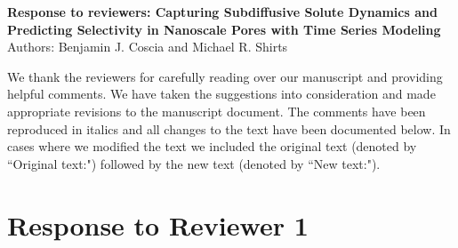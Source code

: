 \documentclass{article}
\begin{document}
\graphicspath{{./figures/}}

\begin{center}
\textbf{Response to reviewers: Capturing Subdiffusive Solute Dynamics and Predicting
Selectivity in Nanoscale Pores with Time Series Modeling} \\
Authors: Benjamin J. Coscia and Michael R. Shirts
\end{center}

We thank the reviewers for carefully reading over our manuscript and providing
helpful comments. We have taken the suggestions into consideration and made
appropriate revisions to the manuscript document. The comments have been reproduced
in italics and all changes to the text have been documented below. In cases where 
we modified the text we included the original text (denoted by ``Original text:") 
followed by the new text (denoted by ``New text:").

\section*{Response to Reviewer 1}
\end{document}
